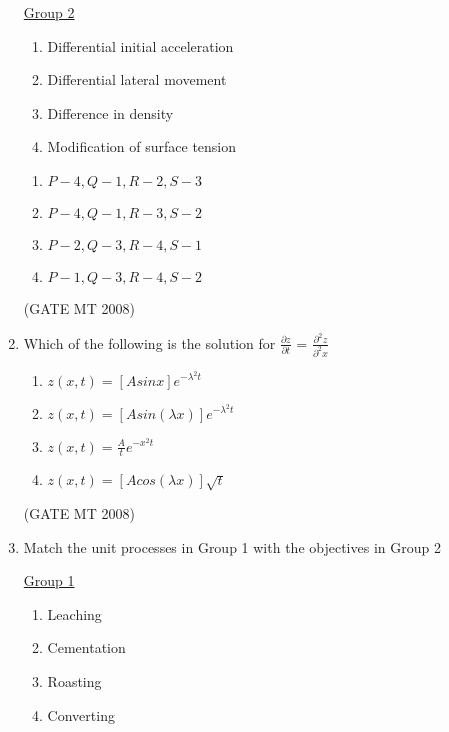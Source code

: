 \documentclass[11pt, letterpaper]{article}
\theoremstyle{remark}
\begin{document}
\begin{enumerate}[label=Q.\arabic*]
\begin{multicols}{2}
     \underline{Group 2}
    \begin{enumerate}[label=(\arabic*), start=1]
        \item Differential initial acceleration
        \item Differential lateral movement
        \item Difference in density
        \item Modification of surface tension 
    \end{enumerate}
\end{multicols}
\vspace{-2em}
\begin{multicols}{2}
      \begin{enumerate}[label=(\MakeUppercase{\alph*})]
        \item $P-4, Q-1, R-2, S-3$
        \item $P-4, Q-1, R-3, S-2$
        \item $P-2, Q-3, R-4, S-1$
        \item $P-1, Q-3, R-4, S-2$
      \end{enumerate}
    \end{multicols}
\vspace{-5mm} 
\hfill(GATE MT 2008)

\item Which of the following is the solution for {\LARGE $\frac{\partial z}{\partial t}$ = $\frac{\partial^2z}{\partial^2x}$}
\vspace{-0.5em}
\begin{multicols}{2}
      \begin{enumerate}
        \item {\large$z(x,t)= [Asinx]$$e^{-\lambda^2 t}$}
        \item {\large$z(x,t)= [Asin(\lambda x)]$$e^{-\lambda^2 t}$} 
        \item {\large$z(x,t)=\frac{A}{t}$$e^{-x^2 t}$}
        \item {\large$z(x,t)= [Acos(\lambda x)]$$\sqrt{t}$}
      \end{enumerate}
    \end{multicols}
\vspace{-5mm} 
\hfill(GATE MT 2008)

\item Match the unit processes in Group 1 with the objectives in Group 2
\begin{multicols}{2}
    \underline{Group 1}
    \begin{enumerate}[label=(\Alph*), start=16]
        \item Leaching
        \item Cementation
        \item Roasting
        \item Converting\\
    \end{enumerate}


\end{multicols}
\end{enumerate}
\end{document}
